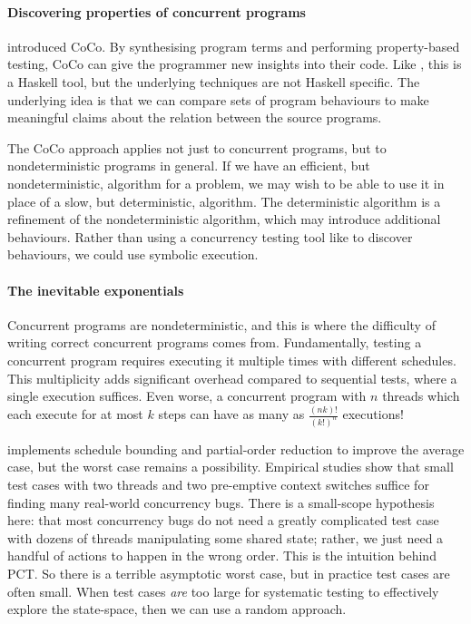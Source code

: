 \paragraph{Discovering properties of concurrent programs}
 introduced CoCo.  By synthesising program terms and
performing property-based testing, CoCo can give the programmer new
insights into their code.  Like \dejafu{}, this is a Haskell tool, but
the underlying techniques are not Haskell specific.  The underlying
idea is that we can compare sets of program behaviours to make
meaningful claims about the relation between the source programs.

The CoCo approach applies not just to concurrent programs, but to
nondeterministic programs in general.  If we have an efficient, but
nondeterministic, algorithm for a problem, we may wish to be able to
use it in place of a slow, but deterministic, algorithm.  The
deterministic algorithm is a refinement of the nondeterministic
algorithm, which may introduce additional behaviours.  Rather than
using a concurrency testing tool like \dejafu{} to discover
behaviours, we could use symbolic execution.

\paragraph{The inevitable exponentials}
Concurrent programs are nondeterministic, and this is where the
difficulty of writing correct concurrent programs comes from.
Fundamentally, testing a concurrent program requires executing it
multiple times with different schedules.  This multiplicity adds
significant overhead compared to sequential tests, where a single
execution suffices.  Even worse, a concurrent program with $n$ threads
which each execute for at most $k$ steps can have as many as
$\frac{(nk)!}{(k!)^{n}}$ executions\cite{musuvathi2007}!

\dejafu{} implements schedule
bounding\cite{emmi2011,musuvathi2008,musuvathi2007} and partial-order
reduction\cite{flanagan2005,godefroid1996} to improve the average
case, but the worst case remains a possibility.  Empirical studies
show that small test cases with two threads and two pre-emptive
context switches suffice for finding many real-world concurrency
bugs\cite{thomson2014}.  There is a small-scope hypothesis here: that
most concurrency bugs do not need a greatly complicated test case with
dozens of threads manipulating some shared state; rather, we just need
a handful of actions to happen in the wrong order.  This is the
intuition behind PCT\cite{burckhardt2010}.  So there is a terrible
asymptotic worst case, but in practice test cases are often small.
When test cases \emph{are} too large for systematic testing to
effectively explore the state-space, then we can use a random
approach.

